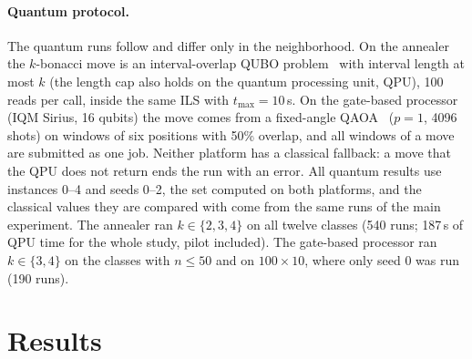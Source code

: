 \documentclass[letterpaper]{article} %
\theoremstyle{definition}
\begin{document}
\paragraph{Quantum protocol.} The quantum runs follow \citet{wojewodzki2026windowed} and differ only in the neighborhood.
On the annealer the $k$-bonacci move is an interval-overlap QUBO problem~\cite{lucas2014ising,kadowaki1998} with
interval length at most $k$ (the length cap also holds on the quantum processing unit, QPU),
100 reads per call, inside the same ILS with $t_{\max}=10$\,s. On the
gate-based processor (IQM Sirius, 16 qubits) the move comes from a
fixed-angle QAOA~\cite{farhi2014qaoa,wojewodzki2026gcmm} ($p=1$, 4096 shots) on windows of six positions with
50\% overlap, and all windows of a move are submitted as one job.
Neither platform has a classical fallback: a move that the QPU does not
return ends the run with an error. All quantum results use instances
0--4 and seeds 0--2, the set computed on both platforms, and the
classical values they are compared with come from the same runs of the
main experiment. The annealer ran $k\in\{2,3,4\}$ on all twelve classes
(540 runs; 187\,s of QPU time for the whole study, pilot included). The
gate-based processor ran $k\in\{3,4\}$ on the classes with $n\leq 50$
and on $100\times 10$, where only seed 0 was run (190 runs).

\section{Results}\label{sec:exp}
\end{document}
